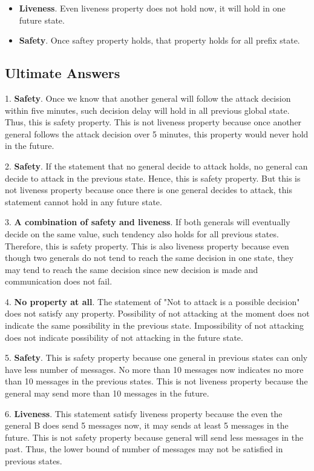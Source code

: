 \documentclass[11pt,a4paper]{article}
\begin{document}
\begin{itemize}
    \item{\textbf{Liveness}. Even liveness property does not hold now, it will hold
            in one future state.}

    \item{\textbf{Safety}. Once saftey property holds, that property holds for all
            prefix state.}
\end{itemize}
\subsection{Ultimate Answers}
1. \textbf{Safety}. 
Once we know that another general will follow the attack decision within five
minutes, such decision delay will hold in all previous global state. Thus,
this is safety property. This is not liveness property because once another
general follows the attack decision over 5 minutes, this property would never
hold in the future.

2. \textbf{Safety}. If the statement that no general decide to attack holds, no
general can decide to attack in the previous state. Hence, this is safety
property. But this is not liveness property because once there is one general
decides to attack, this statement cannot hold in any future state.

3. \textbf{A combination of safety and liveness}. If both generals will eventually
decide on the same value, such tendency also holds for all previous states.
Therefore, this is safety property. This is also liveness property because
even though two generals do not tend to reach the same decision in one state,
they may tend to reach the same decision since new decision is made and
communication does not fail.

4. \textbf{No property at all}. The statement of "Not to attack is a possible
decision" does not satisfy any property. Possibility of not attacking at the
moment does not indicate the same possibility in the previous state.
Impossibility of not attacking does not indicate possibility of not attacking
in the future state.

5. \textbf{Safety}. This is safety property because one general in previous
states can only have less number of messages. No more than 10 messages now
indicates no more than 10 messages in the previous states. This is not
liveness property because the general may send more than 10 messages in the
future.

6. \textbf{Liveness}. This statement satisfy liveness property because the
even the general B does send 5 messages now, it may sends at least 5 messages
in the future. This is not safety property because general will send less
messages in the past. Thus, the lower bound of number of messages may not be
satisfied in previous states.
\newpage
\end{document}
